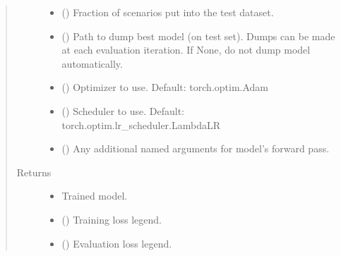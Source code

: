 \documentclass[letterpaper,10pt,english]{sphinxmanual}
\begin{document}
\begin{fulllineitems}
\begin{fulllineitems}
\begin{quote}
\begin{description}
\begin{itemize}
\item {} 
 () \textendash{} Fraction of scenarios put into the test dataset.

\item {} 
 () \textendash{} Path to dump best model (on test set). Dumps can be made at each evaluation iteration.
If None, do not dump model automatically.

\item {} 
 () \textendash{} Optimizer to use. Default: torch.optim.Adam

\item {} 
 () \textendash{} Scheduler to use. Default: torch.optim.lr\_scheduler.LambdaLR

\item {} 
 () \textendash{} Any additional named arguments for model’s forward pass.

\end{itemize}

\item[{Returns}] \leavevmode
\begin{itemize}
\item {} 
 \textendash{} Trained model.

\item {} 
 () \textendash{} Training loss legend.

\item {} 
 () \textendash{} Evaluation loss legend.

\end{itemize}


\end{description}\end{quote}

\end{fulllineitems}


\end{fulllineitems}
\end{document}

